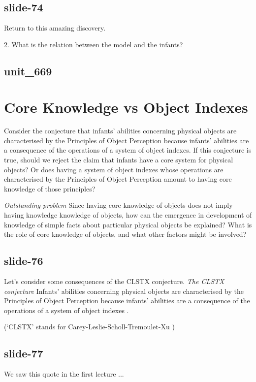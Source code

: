 \documentclass[12pt,\papersize]{extarticle}
\begin{document}
\subsection{slide-74}
Return to this amazing discovery.

2. What is the relation between the model and the infants?

\subsection{unit\_669}


\section{Core Knowledge vs Object Indexes}

Consider the conjecture that infants’ abilities concerning physical objects are
characterised by the Principles of Object Perception because infants’ abilities
are a consequence of the operations of a system of object indexes.
If this conjecture is true, should we reject the claim that infants have a core
system for physical objects?
Or does having a system of object indexes whose operations are characterised by the Principles of
Object Perception amount to having core knowledge of those principles?

\emph{Outstanding problem}
Since having core knowledge of objects does not imply having knowledge knowledge of objects, how
can the emergence in development of knowledge of simple facts about particular physical objects be
explained?
What is the role of core knowledge of objects, and what other factors might be involved?

\subsection{slide-76}
Let’s consider some consequences of the CLSTX conjecture.
\emph{The CLSTX conjecture}
Infants’ abilities concerning physical objects are
characterised by the Principles of Object Perception because infants’ abilities
are a consequence of the operations of a system of object indexes
\citep{Leslie:1998zk,Scholl:1999mi,Carey:2001ue,scholl:2007_objecta}.

(‘CLSTX’ stands for Carey-Leslie-Scholl-Tremoulet-Xu \citep[see][]{Leslie:1998zk,Scholl:1999mi,Carey:2001ue,scholl:2007_objecta})

\subsection{slide-77}
We saw this quote in the first lecture ...
\end{document}
